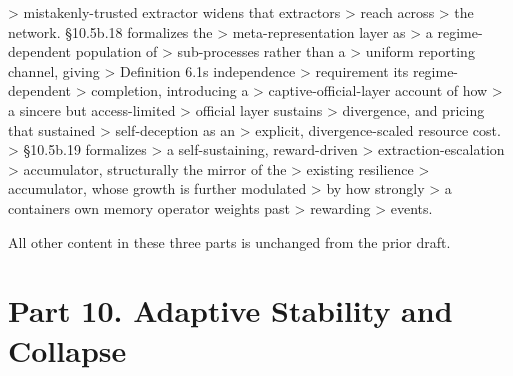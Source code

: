 \documentclass[
]{article}
\begin{document}
\begin{itemize}
  \textgreater{} mistakenly-trusted extractor widens that extractors
  \textgreater{} reach across \textgreater{} the network. §10.5b.18
  formalizes the \textgreater{} meta-representation layer as
  \textgreater{} a regime-dependent population of \textgreater{}
  sub-processes rather than a \textgreater{} uniform reporting channel,
  giving \textgreater{} Definition 6.1s independence \textgreater{}
  requirement its regime-dependent \textgreater{} completion,
  introducing a \textgreater{} captive-official-layer account of how
  \textgreater{} a sincere but access-limited \textgreater{} official
  layer sustains \textgreater{} divergence, and pricing that sustained
  \textgreater{} self-deception as an \textgreater{} explicit,
  divergence-scaled resource cost. \textgreater{} §10.5b.19 formalizes
  \textgreater{} a self-sustaining, reward-driven \textgreater{}
  extraction-escalation \textgreater{} accumulator, structurally the
  mirror of the \textgreater{} existing resilience \textgreater{}
  accumulator, whose growth is further modulated \textgreater{} by how
  strongly \textgreater{} a containers own memory operator weights past
  \textgreater{} rewarding \textgreater{} events.
\end{itemize}

All other content in these three parts is unchanged from the prior
draft.

\hypertarget{part-10.-adaptive-stability-and-collapse}{%
\section{Part 10. Adaptive Stability and
Collapse}\label{part-10.-adaptive-stability-and-collapse}}
\end{document}
